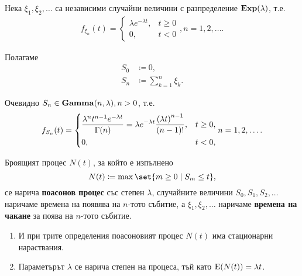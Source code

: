 \documentclass{../../common/topic}
\begin{document}
\begin{definition}\label{def:poisson_process/waiting_times}
  Нека \( \xi_1, \xi_2, \ldots \) са независими случайни величини с разпределение \( \operatorname{\mathbf{Exp}}(\lambda) \), т.е.
  \begin{align*}
    f_{\xi_n}(t) =
    \begin{cases}
      \lambda e^{-\lambda t}, &t \geq 0 \\
      0, &t < 0
    \end{cases},
    n = 1, 2, \ldots.
  \end{align*}

  Полагаме
  \begin{align*}
    S_0 &\coloneqq 0, \\
    S_n &\coloneqq \sum_{k=1}^n \xi_k.
  \end{align*}

  Очевидно \( S_n \in \operatorname{\mathbf{Gamma}}(n, \lambda), n > 0 \), т.е.
  \begin{align*}
    f_{S_n}(t)
    =
    \begin{dcases}
      \frac {\lambda^n t^{n-1} e^{-\lambda t}} {\Gamma(n)} = \lambda e^{-\lambda t} \frac {{(\lambda t)}^{n-1}} {(n-1)!}, &t \geq 0, \\
      0, &t < 0,
    \end{dcases}
    n = 1, 2, \ldots.
  \end{align*}

  Броящият процес \( N(t) \), за който е изпълнено
  \begin{equation*}
    N(t) \coloneqq \max \set{ m \geq 0 \mid S_m \leq t },
  \end{equation*}
  се нарича \textbf{поасонов процес} със степен \( \lambda \), случайните величини \( S_0, S_1, S_2, \ldots \) наричаме времена на появява на \( n \)-тото събитие, а \( \xi_1, \xi_2, \ldots \) наричаме \textbf{времена на чакане} за поява на \( n \)-тото събитие.
\end{definition}

\begin{remark}
  \hfill
  \begin{enumerate}
    \item И при трите определения поасоновият процес \( N(t) \) има стационарни нараствания.
    \item Параметърът \( \lambda \) се нарича степен на процеса, тъй като \( \operatorname{E}(N(t)) = \lambda t \).
  \end{enumerate}
\end{remark}
\end{document}
